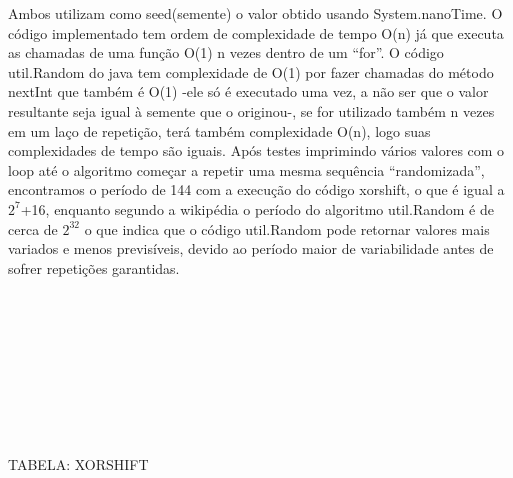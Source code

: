 Ambos utilizam como seed(semente) o valor obtido usando System.nanoTime. O código implementado tem ordem de complexidade de tempo O(n) já que executa as chamadas de uma função  O(1)  n vezes dentro de um “for”. O código util.Random do java tem complexidade de O(1) por fazer chamadas do método nextInt que também é O(1) -ele só é executado uma vez, a não ser que o valor resultante seja igual à semente que o originou-, se for utilizado também n  vezes em um laço de repetição, terá também complexidade O(n), logo suas complexidades de tempo são iguais.
Após testes imprimindo vários valores com o loop até o algoritmo começar a repetir uma mesma sequência “randomizada”, encontramos o período de 144 com a execução do código xorshift, o que é igual a $2^{7}$+16, enquanto segundo a wikipédia \cite{SitWik} o período do algoritmo util.Random é de cerca de $2^{32}$ o que indica que o código util.Random pode retornar valores mais variados e menos previsíveis, devido ao período  maior de variabilidade antes de sofrer repetições garantidas.\cite{SitWik}\\       
\\
\\
\\
\\
\\
\\
\\
\\
\\
TABELA: XORSHIFT
